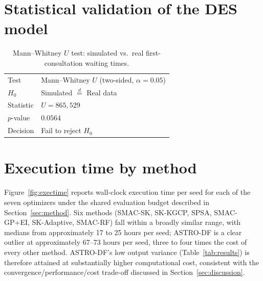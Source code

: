 \documentclass[11pt]{elsarticle}
\begin{document}
\section{Statistical validation of the DES model}
\label{app:validation}
\begin{table}[H]
\centering
\caption{Mann--Whitney $U$ test: simulated vs.\ real first-consultation
         waiting times.}
\label{tab:validation}
\begin{tabular}{@{}ll@{}}
\toprule
Test      & Mann--Whitney $U$ (two-sided, $\alpha=0.05$) \\
$H_0$     & Simulated $\overset{d}{=}$ Real data \\
Statistic & $U = 865{,}529$ \\
$p$-value & $0.0564$ \\
Decision  & Fail to reject $H_0$ \\
\bottomrule
\end{tabular}
\end{table}

\section{Execution time by method}
\label{app:time}
Figure~\ref{fig:exectime} reports wall-clock execution time per seed for each of the
seven optimizers under the shared evaluation budget described in
Section~\ref{sec:method}. Six methods (SMAC-SK, SK-KGCP, SPSA, SMAC-GP+EI,
SK-Adaptive, SMAC-RF) fall within a broadly similar range, with medians from
approximately 17 to 25 hours per seed; ASTRO-DF is a clear outlier at approximately
67--73 hours per seed, three to four times the cost of every other method.
ASTRO-DF's low output variance (Table~\ref{tab:results}) is therefore attained at
substantially higher computational cost, consistent with the convergence/performance/cost
trade-off discussed in Section~\ref{sec:discussion}.




\end{document}
